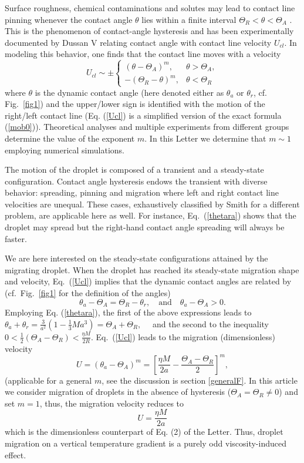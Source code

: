 \documentclass[%
 amsmath,amssymb,
 aps,
10.5pt]{revtex4-2}
\def\rr#1{(\ref{#1})}
\newcommand{\be}{\begin{equation}}
\newcommand{\ee}{\end{equation}}
\begin{document}
Surface roughness, chemical contaminations and solutes may lead to contact line pinning whenever
the contact angle $\theta$ lies within a finite interval $\Theta_R<\theta<\Theta_A$ \cite{deGennes1985}. 
This is the phenomenon of contact-angle hysteresis and has been experimentally documented by Dussan V \cite[Fig.~2]{Dussan1979}
relating contact angle with contact line velocity $U_{cl}$. In modeling this behavior, one finds that the contact
line moves with a velocity \cite{Oron1997}
\be \label{Ucl}
U_{cl} \sim \pm
\left\{  \begin{array}{cc}
(\theta - \Theta_A)^m, & \theta>\Theta_A,\\  
-(\Theta_R - \theta)^m, & \theta < \Theta_R
\end{array}
\right.
\ee
where $\theta$ is the dynamic contact angle (here denoted either as $\theta_a$ or $\theta_r$, cf. Fig.~\ref{fig1})
and the upper/lower sign is identified with the motion of the right/left contact line (Eq. \rr{Ucl} is a 
simplified version of the exact formula \rr{mob0}).  
Theoretical analyses \cite{Ehrhard1991,deGennes1985} and multiple experiments from different groups %
\cite{Marsh1993,*Ehrhard1993,*Tanner1979, *Chen1988} determine the value of the exponent $m$. 
In this Letter we determine that $m\sim 1$ employing numerical simulations. 

The motion of the droplet is composed of a transient and a steady-state configuration. Contact angle hysteresis endows the 
transient with diverse behavior:
spreading, pinning and migration where left and right contact line velocities are unequal.
These cases, exhaustively classified by Smith \cite{Smith1995} for a different problem, 
are applicable here as well. For instance, Eq.~\rr{thetara} shows that the droplet may spread
but the right-hand contact angle spreading will always be faster. 



We are here interested on the steady-state configurations
attained by the migrating droplet. When the droplet has reached  its steady-state migration shape and velocity, 
Eq.~\rr{Ucl} implies that the dynamic contact
angles are related by (cf.~Fig.~\ref{fig1} for the definition of the angles)
\be
\theta_a - \Theta_A = \Theta_R - \theta_r, \quad \textrm{and} \quad \theta_a-\Theta_A>0. 
\ee
Employing Eq. \rr{thetara}, the first of the above expressions leads to 
$
\theta_a+\theta_r = \frac{3}{a^2}(1 - \frac{1}{3}Ma^3) = \Theta_A + \Theta_R, \quad
$
and the second to the inequality 
$
0< \frac{1}{2}(\Theta_A - \Theta_R) < \frac{\eta M}{2R}. 
$
Eq.~\rr{Ucl} leads to the migration (dimensionless) velocity
\be
U = (\theta_a - \Theta_A)^m = \left[ \frac{\eta M}{2a} - \frac{\Theta_A-\Theta_R}{2}\right]^m,
\ee
(applicable for a general $m$, see the discussion is section \ref{generalF}. 
In this article we consider migration of droplets in the absence of hysteresis ($\Theta_A = \Theta_R \neq 0$) and set $m=1$, thus, the migration velocity reduces to 
\be \label{UM2a}
U = \frac{\eta M}{2a}
\ee
which is the dimensionless counterpart of Eq. (2) of the Letter. 
Thus, droplet migration on a vertical temperature gradient is a purely odd viscosity-induced effect. 
\end{document}
